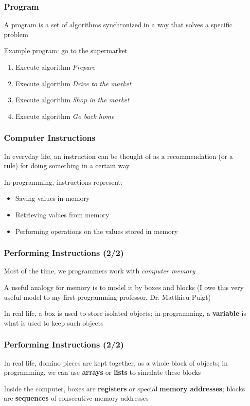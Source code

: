 \documentclass{beamer}
\begin{document}
\begin{frame}
\frametitle{Program}
    A program is a set of algorithms synchronized in a way that solves a specific problem
    \newline

    Example program: go to the supermarket
    \begin{enumerate}
        \item Execute algorithm \emph{Prepare}
        \item Execute algorithm \emph{Drive to the market}
        \item Execute algorithm \emph{Shop in the market}
        \item Execute algorithm \emph{Go back home}
    \end{enumerate}
\end{frame}

\begin{frame}
\frametitle{Computer Instructions}
    In everyday life, an instruction can be thought of as a recommendation (or a rule) for doing something in a certain way
    \newline

    In programming, instructions represent:
    \begin{itemize}
        \item Saving values in memory
        \item Retrieving values from memory
        \item Performing operations on the values stored in memory
    \end{itemize}
\end{frame}

\begin{frame}
\frametitle{Performing Instructions (2/2)}
    Most of the time, we programmers work with \emph{computer memory}
    \newline

    A useful analogy for memory is to model it by boxes and blocks (I owe this very useful model to my first programming professor, Dr. Matthieu Puigt)
    \newline

    In real life, a box is used to store isolated objects; in programming, a \textbf{variable} is what is used to keep such objects
\end{frame}

\begin{frame}
\frametitle{Performing Instructions (2/2)}
    In real life, domino pieces are kept together, as a whole block of objects; in programming, we can use \textbf{arrays} or \textbf{lists} to simulate these blocks
    \newline

    Inside the computer, boxes are \textbf{registers} or special \textbf{memory addresses}; blocks are \textbf{sequences} of consecutive memory addresses
\end{frame}
\end{document}
